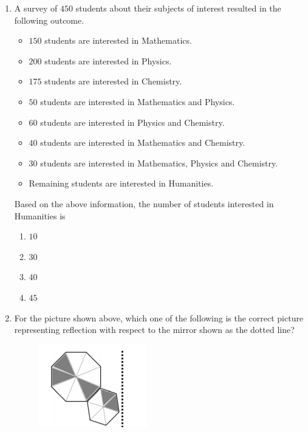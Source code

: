 \documentclass[a4paper,10pt]{article}
\begin{document}
\begin{enumerate}
\item A survey of $450$ students about their subjects of interest resulted in the following outcome.
\begin{itemize}
	\item $150$ students are interested in Mathematics.
	\item $200$ students are interested in Physics.
	\item $175$ students are interested in Chemistry.
	\item $50$ students are interested in Mathematics and Physics.
	\item $60$ students are interested in Physics and Chemistry.
	\item $40$ students are interested in Mathematics and Chemistry.
	\item $30$ students are interested in Mathematics, Physics and Chemistry.
	\item Remaining students are interested in Humanities.
\end{itemize}
Based on the above information, the number of students interested in Humanities is

\hfill{}
\begin{enumerate}
	\item $10$
	\item $30$
	\item $40$
	\item $45$
\end{enumerate}

\item For the picture shown above, which one of the following is the correct picture representing reflection with respect to the mirror shown as the dotted line?
\begin{figure}[H]
	\centering
	\includegraphics[width=0.3\columnwidth]{q5.png}
	\caption*{}
	\label{fig:q5}
\end{figure}


\end{enumerate}
\end{document}
